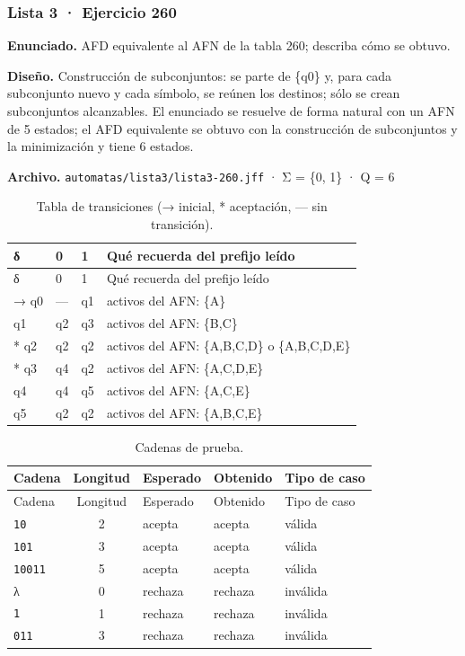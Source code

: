 
\hypertarget{lista-3-ejercicio-260}{%
\subsubsection{Lista 3 · Ejercicio 260}\label{lista-3-ejercicio-260}}

\textbf{Enunciado.} AFD equivalente al AFN de la tabla 260; describa cómo se obtuvo.

\textbf{Diseño.} Construcción de subconjuntos: se parte de \{q0\} y, para cada subconjunto nuevo y cada símbolo, se reúnen los destinos; sólo se crean subconjuntos alcanzables. El enunciado se resuelve de forma natural con un AFN de 5 estados; el AFD equivalente se obtuvo con la construcción de subconjuntos y la minimización y tiene 6 estados.

\textbf{Archivo.} \texttt{automatas/lista3/lista3-260.jff} · Σ = \{0, 1\} · \textbar Q\textbar{} = 6

\begin{longtable}[]{@{}llll@{}}
\caption{Tabla de transiciones (→ inicial, * aceptación, --- sin transición).}\tabularnewline
\toprule\noalign{}
δ & 0 & 1 & Qué recuerda del prefijo leído \\
\midrule\noalign{}
\endfirsthead
\toprule\noalign{}
δ & 0 & 1 & Qué recuerda del prefijo leído \\
\midrule\noalign{}
\endhead
\bottomrule\noalign{}
\endlastfoot
→ q0 & --- & q1 & activos del AFN: \{A\} \\
q1 & q2 & q3 & activos del AFN: \{B,C\} \\
* q2 & q2 & q2 & activos del AFN: \{A,B,C,D\} o \{A,B,C,D,E\} \\
* q3 & q4 & q2 & activos del AFN: \{A,C,D,E\} \\
q4 & q4 & q5 & activos del AFN: \{A,C,E\} \\
q5 & q2 & q2 & activos del AFN: \{A,B,C,E\} \\
\end{longtable}

\begin{longtable}[]{@{}lclll@{}}
\caption{Cadenas de prueba.}\tabularnewline
\toprule\noalign{}
Cadena & Longitud & Esperado & Obtenido & Tipo de caso \\
\midrule\noalign{}
\endfirsthead
\toprule\noalign{}
Cadena & Longitud & Esperado & Obtenido & Tipo de caso \\
\midrule\noalign{}
\endhead
\bottomrule\noalign{}
\endlastfoot
\texttt{10} & 2 & acepta & acepta & válida \\
\texttt{101} & 3 & acepta & acepta & válida \\
\texttt{10011} & 5 & acepta & acepta & válida \\
λ & 0 & rechaza & rechaza & inválida \\
\texttt{1} & 1 & rechaza & rechaza & inválida \\
\texttt{011} & 3 & rechaza & rechaza & inválida \\
\end{longtable}


